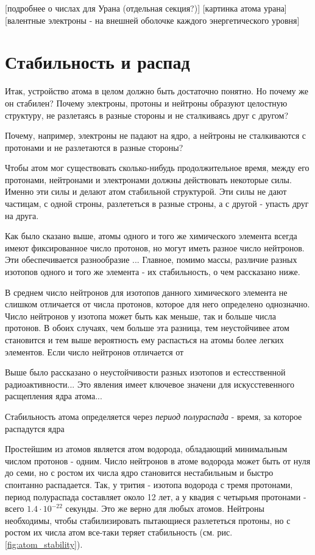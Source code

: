 [подробнее о числах для Урана (отдельная секция?)]
[картинка атома урана]
[валентные электроны - на внешней оболочке каждого энергетического уровня]


\section*{Стабильность и распад}

Итак, устройство атома в целом должно быть достаточно понятно.
Но почему же он стабилен?
Почему электроны, протоны и нейтроны образуют целостную структуру, не разлетаясь в разные стороны и не сталкиваясь друг с другом?


Почему, например, электроны не падают на ядро, а нейтроны не сталкиваются с протонами и не разлетаются в разные стороны?


Чтобы атом мог существовать сколько-нибудь продолжительное время, между его протонами, нейтронами и электронами должны действовать некоторые силы.
Именно эти силы и делают атом стабильной структурой.
Эти силы не дают частицам, с одной строны, разлететься в разные строны, а с другой - упасть друг на друга.



Как было сказано выше, атомы одного и того же химического элемента всегда имеют фиксированное число протонов, но могут иметь разное число нейтронов. 
Эти обеспечивается разнообразие ...
Главное, помимо массы, различие разных изотопов одного и того же элемента - их стабильность, о чем рассказано ниже.



В среднем число нейтронов для изотопов данного химического элемента не слишком отличается от числа протонов, которое для него определено однозначно.
Число нейтронов у изотопа может быть как меньше, так и больше числа протонов.
В обоих случаях, чем больше эта разница, тем неустойчивее атом становится и тем выше вероятность ему распасться на атомы более легких элементов.
Если число нейтронов отличается от 

Выше было рассказано о неустойчивости разных изотопов и естесственной радиоактивности...
Это явления имеет ключевое значени для искусстевенного расщепления ядра атома...


Стабильность атома определяется через \textit{период полураспада} - время, за которое распадутся ядра 




Простейшим из атомов является атом водорода, обладающий минимальным числом протонов - одним.
Число нейтронов в атоме водорода может быть от нуля до семи, но с ростом их числа ядро становится нестабильным и быстро спонтанно распадается.
Так, у трития - изотопа водорода с тремя протонами, период полураспада составляет около 12 лет, а у квадия с четырьмя протонами - всего $1.4\cdot 10^{−22}$ секунды.
Это же верно для любых атомов.
Нейтроны необходимы, чтобы стабилизировать пытающиеся разлететься протоны, но с ростом их числа атом все-таки теряет стабильность (см. рис. \ref{fig:atom_stability}).


